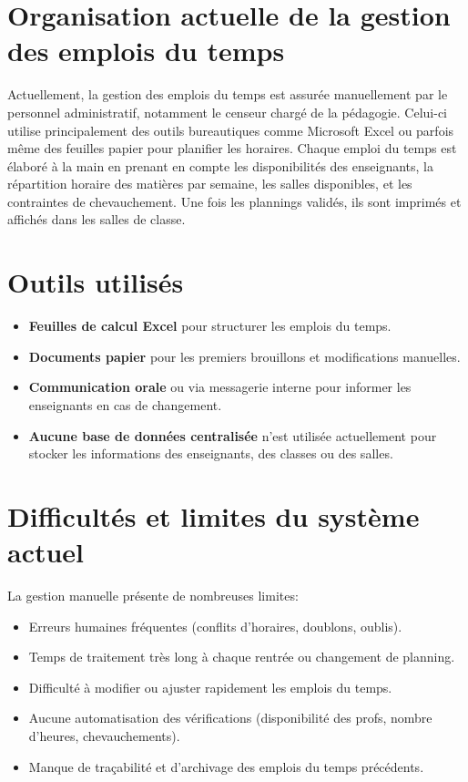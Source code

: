\documentclass[english,12pt,a4paper]{report}
\begin{document}
\section{Organisation actuelle de la gestion des emplois du temps}
Actuellement, la gestion des emplois du temps est assurée manuellement par le personnel administratif, notamment le censeur chargé de la pédagogie. Celui-ci utilise principalement des outils bureautiques comme Microsoft Excel ou parfois même des feuilles papier pour planifier les horaires.
Chaque emploi du temps est élaboré à la main en prenant en compte les disponibilités des enseignants, la répartition horaire des matières par semaine, les salles disponibles, et les contraintes de chevauchement. Une fois les plannings validés, ils sont imprimés et affichés dans les salles de classe.

\section{Outils utilisés}
\begin{itemize}
	\item \textbf{Feuilles de calcul Excel} pour structurer les emplois du temps.
	\item \textbf{Documents papier} pour les premiers brouillons et modifications manuelles.
	\item \textbf{Communication orale} ou via messagerie interne pour informer les enseignants en cas de changement.
	\item \textbf{Aucune base de données centralisée} n'est utilisée actuellement pour stocker les informations des enseignants, des classes ou des salles.
\end{itemize}

\section{Difficultés et limites du système actuel}
La gestion manuelle présente de nombreuses limites:
\begin{itemize}
	\item Erreurs humaines fréquentes (conflits d’horaires, doublons, oublis).
	\item Temps de traitement très long à chaque rentrée ou changement de planning.
	\item Difficulté à modifier ou ajuster rapidement les emplois du temps.
	\item Aucune automatisation des vérifications (disponibilité des profs, nombre d’heures, chevauchements).
	\item Manque de traçabilité et d’archivage des emplois du temps précédents.
\end{itemize}
\end{document}

